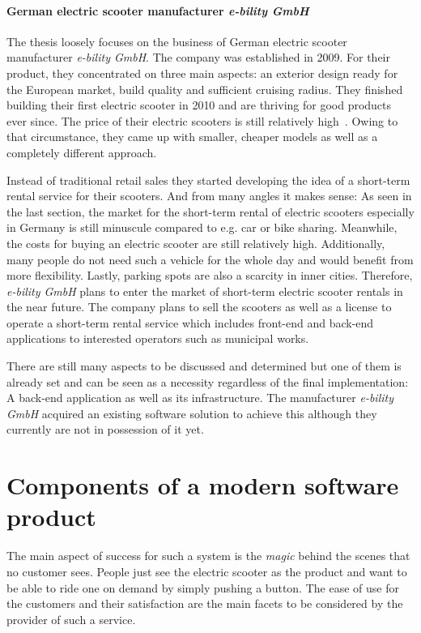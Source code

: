\documentclass[12pt,a4paper,twoside]{report}
\begin{document}
\paragraph{German electric scooter manufacturer \textit{e-bility GmbH}} \label{sect:e-bility GmbH}

The thesis loosely focuses on the business of German electric scooter manufacturer \textit{e-bility GmbH}.
The company was established in 2009. For their product, they concentrated on three main aspects:
an exterior design ready for the European market, build quality and sufficient cruising radius.
They finished building their first electric scooter in 2010 and are thriving for good products ever since.
The price of their electric scooters is still relatively high~\cite{e-bility}.
Owing to that circumstance, they came up with smaller, cheaper models
as well as a completely different approach.

Instead of traditional retail sales they started developing the idea of a
short-term rental service for their scooters. And from many angles it makes sense:
As seen in the last section, the market for the short-term rental of electric scooters
especially in Germany is still minuscule compared to e.g. car or bike sharing.
Meanwhile, the costs for buying an electric scooter are still relatively high.
Additionally, many people do not need such a vehicle for the whole day and would benefit
from more flexibility. Lastly, parking spots are also a scarcity in inner cities.
Therefore, \textit{e-bility GmbH} plans to enter the market of short-term electric scooter rentals
in the near future. The company plans to sell the scooters as well as a license
to operate a short-term rental service which includes front-end and back-end applications
to interested operators such as municipal works.

There are still many aspects to be discussed and determined but one of them
is already set and can be seen as a necessity regardless of the final implementation:
A back-end application as well as its infrastructure.
The manufacturer \textit{e-bility GmbH} acquired an existing software solution
to achieve this although they currently are not in possession of it yet.


\section{Components of a modern software product} \label{sect:frontend/backend}

The main aspect of success for such a system is the \textit{magic} behind the scenes
that no customer sees. People just see the electric scooter as the product and
want to be able to ride one on demand by simply pushing a button.
The ease of use for the customers and their satisfaction are the main facets
to be considered by the provider of such a service.
\end{document}
